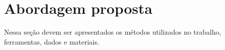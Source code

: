 \section{Abordagem proposta}
Nessa seção devem ser apresentados os métodos utilizados no trabalho, ferramentas, dados e materiais.